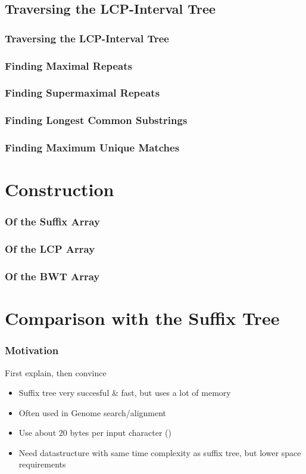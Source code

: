 \documentclass[compress,handout]{beamer} %
\begin{document}
\subsection{Traversing the LCP-Interval Tree}

\begin{frame}
	\frametitle{Traversing the LCP-Interval Tree}
\end{frame}

\begin{frame}
	\frametitle{Finding Maximal Repeats}
\end{frame}

\begin{frame}
	\frametitle{Finding Supermaximal Repeats}
\end{frame}

\begin{frame}
	\frametitle{Finding Longest Common Substrings}
\end{frame}

\begin{frame}
	\frametitle{Finding Maximum Unique Matches}
\end{frame}

\section{Construction}

\begin{frame}
	\frametitle{Of the Suffix Array}
\end{frame}

\begin{frame}
	\frametitle{Of the LCP Array}
\end{frame}

\begin{frame}
	\frametitle{Of the BWT Array}
\end{frame}

\section{Comparison with the Suffix Tree}

\begin{frame}
	\frametitle{Motivation}
	First explain, then convince

	\begin{itemize}
		\item Suffix tree very succesful \& fast, but uses a lot of memory
		\item Often used in Genome search/alignment
		\item Use about 20 bytes per input character (\citealt{kurtz1999reducing})
		\item Need datastructure with same time complexity as suffix tree, but lower space requirements
	\end{itemize}
\end{frame}
\end{document}
